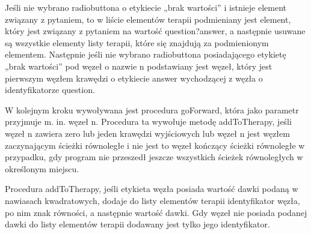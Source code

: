 Jeśli nie wybrano radiobuttona o etykiecie „brak wartości” i istnieje element związany z pytaniem, to w liście elementów terapii podmieniany jest element, który jest związany z pytaniem na wartość question?answer, a następnie usuwane są wszystkie elementy listy terapii, które się znajdują za podmienionym elementem. 
Następnie jeśli nie wybrano radiobuttona posiadającego etykietę „brak wartości” pod węzeł o nazwie n podstawiany jest węzeł, który jest pierwszym węzłem krawędzi o etykiecie answer wychodzącej z węzła o identyfikatorze question. 

W kolejnym kroku wywoływana jest procedura goForward, która jako parametr przyjmuje m. in. węzeł n. Procedura ta wywołuje metodę addToTherapy, 
jeśli węzeł n zawiera zero lub jeden krawędzi wyjściowych lub węzeł n jest węzłem zaczynającym ścieżki równoległe i nie jest to węzeł kończący ścieżki równoległe w przypadku, gdy program nie przeszedł jeszcze wszystkich ścieżek równoległych w określonym miejscu. 

Procedura addToTherapy, jeśli etykieta węzła posiada wartość dawki podaną w nawiasach kwadratowych, dodaje do listy elementów terapii identyfikator węzła, po nim znak równości, a następnie wartość dawki. Gdy węzeł nie posiada podanej dawki do listy elementów terapii dodawany jest tylko jego identyfikator. 

